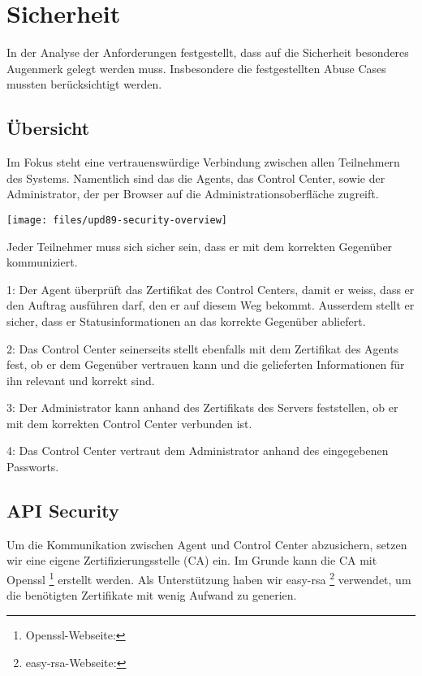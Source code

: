 \section{Sicherheit}

In der Analyse der Anforderungen festgestellt, dass auf die Sicherheit besonderes Augenmerk gelegt werden muss. Insbesondere die festgestellten Abuse Cases mussten berücksichtigt werden.

\subsection*{Übersicht}

Im Fokus steht eine vertrauenswürdige Verbindung zwischen allen Teilnehmern des Systems. Namentlich sind das die Agents, das Control Center, sowie der Administrator, der per Browser auf die Administrationsoberfläche zugreift.

\begin{center}
    \texttt{[image: files/upd89-security-overview]}
\end{center}

\xxx[caption!]

Jeder Teilnehmer muss sich sicher sein, dass er mit dem korrekten Gegenüber kommuniziert.

1: Der Agent überprüft das Zertifikat des Control Centers, damit er weiss, dass er den Auftrag ausführen darf, den er auf diesem Weg bekommt. Ausserdem stellt er sicher, dass er Statusinformationen an das korrekte Gegenüber abliefert.

2: Das Control Center seinerseits stellt ebenfalls mit dem Zertifikat des Agents fest, ob er dem Gegenüber vertrauen kann und die gelieferten Informationen für ihn relevant und korrekt sind.

3: Der Administrator kann anhand des Zertifikats des Servers feststellen, ob er mit dem korrekten Control Center verbunden ist.

4: Das Control Center vertraut dem Administrator anhand des eingegebenen Passworts.

\subsection*{API Security}

Um die Kommunikation zwischen Agent und Control Center abzusichern, setzen wir eine eigene Zertifizierungsstelle (CA) ein. Im Grunde kann die CA mit Openssl \footnote{Openssl-Webseite: } erstellt werden. Als Unterstützung haben wir easy-rsa \footnote{easy-rsa-Webseite: } verwendet, um die benötigten Zertifikate mit wenig Aufwand zu generien.

